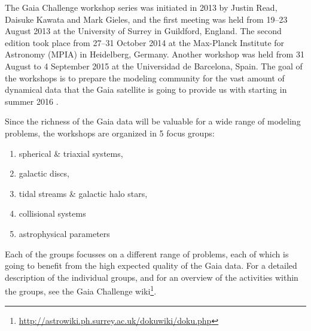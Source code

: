 The Gaia Challenge workshop series was initiated in 2013 by Justin Read, Daisuke Kawata and Mark Gieles, and the first meeting was held from 19--23 August 2013 at the University of Surrey in Guildford, England. 
The second edition took place from 27--31 October 2014 at the Max-Planck Institute for Astronomy (MPIA) in Heidelberg, Germany. 
Another workshop was held from 31 August to 4 September 2015 at the Universidad de Barcelona, Spain.
The goal of the workshops is to prepare the modeling community for the vast amount of dynamical data that the Gaia satellite is going to provide us with starting in summer 2016 \citep{Perryman01}.

Since the richness of the Gaia data will be valuable for a wide range of modeling problems, the workshops are organized in 5 focus groups:
\begin{enumerate}
\item spherical \& triaxial systems,
\item galactic discs,
\item tidal streams \& galactic halo stars,
\item collisional systems
\item astrophysical parameters 
\end{enumerate}
Each of the groups focusses on a different range of problems, each of which is going to benefit from the high expected quality of the Gaia data. For a detailed description of the individual groups, and for an overview of the activities within the groups, see the Gaia Challenge wiki\footnote{\url{http://astrowiki.ph.surrey.ac.uk/dokuwiki/doku.php}}.
